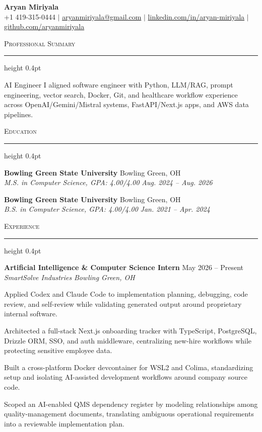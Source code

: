 \documentclass[letterpaper,11pt]{article}
\newcommand{\resumesection}[1]{%
  \par\vspace{2pt}%
  {\large\scshape #1}\par\vspace{2pt}%
  \hrule height 0.4pt\vspace{2pt}%
}
\newcommand{\resumeSubheading}[4]{
  \textbf{#1} \hfill #2\\
  \textit{#3} \hfill \textit{#4}
}
\begin{document}
\begin{center}
  {\LARGE \textbf{Aryan Miriyala}}\\[-1pt]
  \small
  +1 419-315-0444 $|$
  \href{mailto:aryanmiriyala@gmail.com}{aryanmiriyala@gmail.com} $|$
  \href{https://www.linkedin.com/in/aryan-miriyala-7788a21b6/}{linkedin.com/in/aryan-miriyala} $|$
  \href{https://github.com/aryanmiriyala}{github.com/aryanmiriyala}
\end{center}\vspace{-10pt}

\resumesection{Professional Summary}
AI Engineer I aligned software engineer with Python, LLM/RAG, prompt engineering, vector search, Docker, Git, and healthcare workflow experience across OpenAI/Gemini/Mistral systems, FastAPI/Next.js apps, and AWS data pipelines.

\resumesection{Education}
\resumeSubheading
{Bowling Green State University}{Bowling Green, OH}
{M.S. in Computer Science, GPA: 4.00/4.00}{Aug. 2024 -- Aug. 2026}

\resumeSubheading
{Bowling Green State University}{Bowling Green, OH}
{B.S. in Computer Science, GPA: 4.00/4.00}{Jan. 2021 -- Apr. 2024}

\resumesection{Experience}
\resumeSubheading
{Artificial Intelligence \& Computer Science Intern}{May 2026 -- Present}
{SmartSolve Industries}{Bowling Green, OH}
\begin{tightitemize}
  \item Applied Codex and Claude Code to implementation planning, debugging, code review, and self-review while validating generated output around proprietary internal software.
  \item Architected a full-stack Next.js onboarding tracker with TypeScript, PostgreSQL, Drizzle ORM, SSO, and auth middleware, centralizing new-hire workflows while protecting sensitive employee data.
  \item Built a cross-platform Docker devcontainer for WSL2 and Colima, standardizing setup and isolating AI-assisted development workflows around company source code.
  \item Scoped an AI-enabled QMS dependency register by modeling relationships among quality-management documents, translating ambiguous operational requirements into a reviewable implementation plan.
\end{tightitemize}
\end{document}
